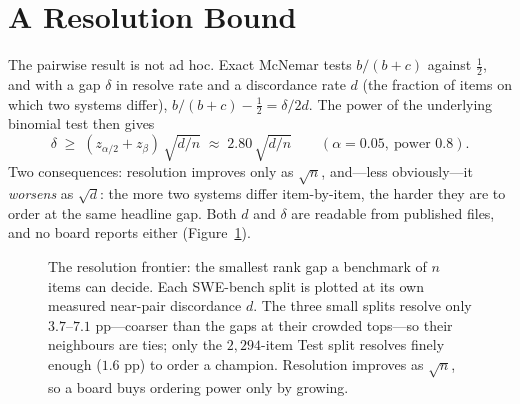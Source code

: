 \documentclass{article}
\begin{document}
\section{A Resolution Bound}
\label{sec:law}
The pairwise result is not ad hoc. Exact McNemar tests $b/(b+c)$ against $\tfrac12$, and with a gap
$\delta$ in resolve rate and a discordance rate $d$ (the fraction of items on which two systems
differ), $b/(b+c)-\tfrac12 = \delta/2d$. The power of the underlying binomial test then gives
\begin{equation}
\delta \;\ge\; (z_{\alpha/2}+z_{\beta})\,\sqrt{d/n} \;\approx\; 2.80\,\sqrt{d/n}
\qquad (\alpha=0.05,\ \text{power }0.8).
\label{eq:law}
\end{equation}
Two consequences: resolution improves only as $\sqrt{n}$, and---less obviously---it \emph{worsens} as
$\sqrt{d}$: the more two systems differ item-by-item, the harder they are to order at the same headline
gap. Both $d$ and $\delta$ are readable from published files, and no board reports either
(Figure~\ref{fig:frontier}).

\begin{figure}[t]
\centering
{}
\caption{The resolution frontier: the smallest rank gap a benchmark of $n$ items can decide. Each
SWE-bench split is plotted at its own measured near-pair discordance $d$. The three small splits
resolve only $3.7$--$7.1$ pp---coarser than the gaps at their crowded tops---so their neighbours are
ties; only the $2{,}294$-item Test split resolves finely enough ($1.6$ pp) to order a champion.
Resolution improves as $\sqrt{n}$, so a board buys ordering power only by growing.}
\label{fig:frontier}
\end{figure}
\end{document}
